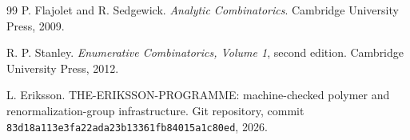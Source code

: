 \documentclass[11pt]{article}
\begin{document}
\begin{thebibliography}{99}
P. Flajolet and R. Sedgewick.
\newblock \emph{Analytic Combinatorics}.
\newblock Cambridge University Press, 2009.

R. P. Stanley.
\newblock \emph{Enumerative Combinatorics, Volume 1}, second edition.
\newblock Cambridge University Press, 2012.

L. Eriksson.
\newblock THE-ERIKSSON-PROGRAMME: machine-checked polymer and renormalization-group infrastructure.
\newblock Git repository, commit \texttt{83d18a113e3fa22ada23b13361fb84015a1c80ed}, 2026.

\end{thebibliography}
\end{document}
